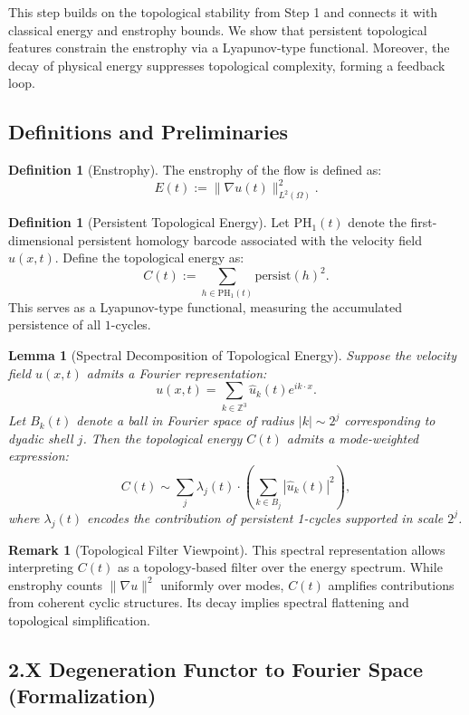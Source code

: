 \documentclass[11pt]{article}
\newtheorem{lemma}[theorem]{Lemma}
\theoremstyle{definition}
\newtheorem{definition}[theorem]{Definition}
\newtheorem{remark}[theorem]{Remark}
\begin{document}
This step builds on the topological stability from Step 1 and connects it with classical energy and enstrophy bounds. We show that persistent topological features constrain the enstrophy via a Lyapunov-type functional. Moreover, the decay of physical energy suppresses topological complexity, forming a feedback loop.

\subsection{Definitions and Preliminaries}

\begin{definition}[Enstrophy]
The enstrophy of the flow is defined as:
\[
E(t) := \|\nabla u(t)\|_{L^2(\Omega)}^2.
\]
\end{definition}

\begin{definition}[Persistent Topological Energy]
Let $\mathrm{PH}_1(t)$ denote the first-dimensional persistent homology barcode associated with the velocity field $u(x,t)$. Define the topological energy as:
\[
C(t) := \sum_{h \in \mathrm{PH}_1(t)} \mathrm{persist}(h)^2.
\]
This serves as a Lyapunov-type functional, measuring the accumulated persistence of all $1$-cycles.
\end{definition}

\begin{lemma}[Spectral Decomposition of Topological Energy]
Suppose the velocity field $u(x,t)$ admits a Fourier representation:
\[
u(x,t) = \sum_{k \in \mathbb{Z}^3} \hat{u}_k(t) e^{i k \cdot x}.
\]
Let $B_k(t)$ denote a ball in Fourier space of radius $|k| \sim 2^j$ corresponding to dyadic shell $j$. Then the topological energy $C(t)$ admits a mode-weighted expression:
\[
C(t) \sim \sum_{j} \lambda_j(t) \cdot \left(\sum_{k \in B_j} |\hat{u}_k(t)|^2\right),
\]
where $\lambda_j(t)$ encodes the contribution of persistent 1-cycles supported in scale $2^j$.
\end{lemma}

\begin{remark}[Topological Filter Viewpoint]
This spectral representation allows interpreting $C(t)$ as a topology-based filter over the energy spectrum. While enstrophy counts $\|\nabla u\|^2$ uniformly over modes, $C(t)$ amplifies contributions from coherent cyclic structures. Its decay implies spectral flattening and topological simplification.
\end{remark}

\subsection*{2.X Degeneration Functor to Fourier Space (Formalization)}
\end{document}
